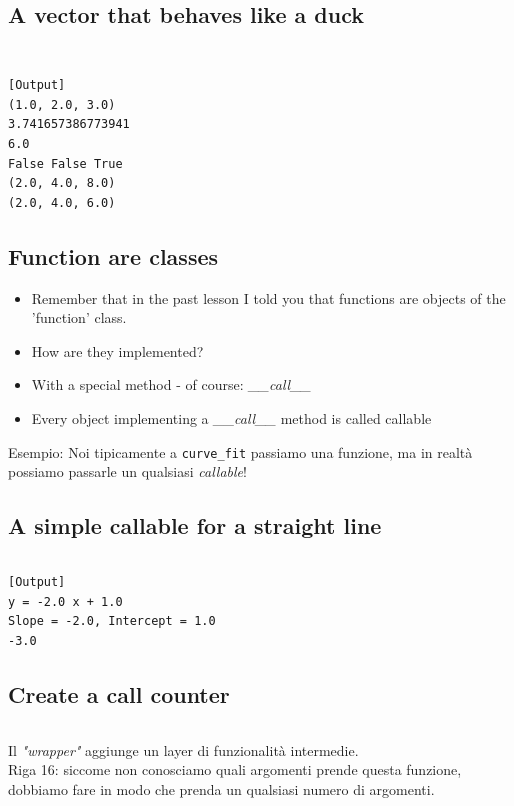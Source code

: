 \subsection{A vector that behaves like a duck}
\inputminted{python}{snippets/vector_ducked.py}
\inputminted{python}{snippets/test_vector_ducked.py}
\begin{verbatim}
[Output]
(1.0, 2.0, 3.0)
3.741657386773941
6.0
False False True
(2.0, 4.0, 8.0)
(2.0, 4.0, 6.0)
\end{verbatim} 

\subsection{Function are classes}
  
  \begin{itemize}
    \item Remember that in the past lesson I told you that functions are objects
          of the 'function' class.
    \item How are they implemented?
    \medskip
    \item With a special method - of course: \emph{\_\_call\_\_}
    \item Every object implementing a \emph{\_\_call\_\_} method is called \alert{callable}
  \end{itemize}
  
Esempio: Noi tipicamente a \texttt{curve\_fit} passiamo una funzione, ma in realtà possiamo passarle un qualsiasi \textit{callable}!

\subsection{A simple callable for a straight line}

\inputminted{python}{snippets/callable_line.py}
\begin{verbatim}
[Output]
y = -2.0 x + 1.0
Slope = -2.0, Intercept = 1.0
-3.0
\end{verbatim} 

\subsection{Create a call counter}

\inputminted{python}{snippets/callable.py}
Il \textit{"wrapper"} aggiunge un layer di funzionalità intermedie.\\
Riga 16: siccome non conosciamo quali argomenti prende questa funzione, dobbiamo fare in modo che prenda un qualsiasi numero di argomenti.\\

